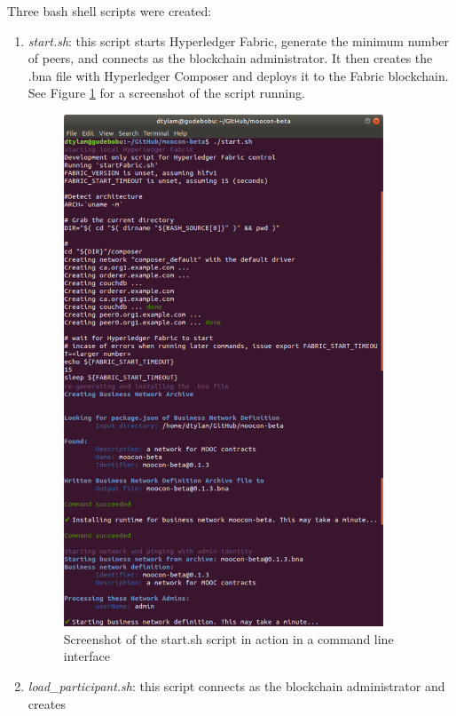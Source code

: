 Three bash shell scripts were created:
\begin{enumerate}
	\setlength\itemsep{0em}    
    \item \textit{start.sh}: this script starts Hyperledger Fabric, generate the minimum number of peers, 
    and connects as the blockchain administrator. It then creates the .bna file with Hyperledger Composer 
    and deploys it to the Fabric blockchain.
    See Figure \ref{fig:startsh} for a screenshot of the script running.
    \begin{figure}[!ht] 
        \centering    
        \includegraphics[width=0.9\textwidth]{startsh}
        \caption[Blockchain Startup Script Screenshot]
            {Screenshot of the start.sh script in action in a command line interface}
        \label{fig:startsh}
    \end{figure}
    \item \textit{load\_participant.sh}: this script connects as the blockchain administrator and creates 

\end{enumerate}
